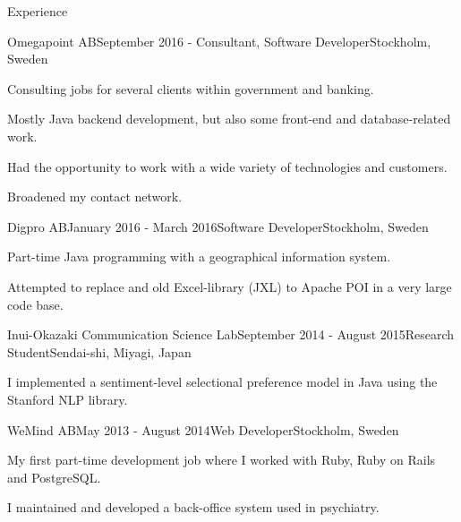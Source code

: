 \documentclass{resume} %
\begin{document}
\begin{rSection}{Experience}

\begin{rSubsection}{Omegapoint AB}{September 2016 - }{Consultant, Software Developer}{Stockholm, Sweden}
\item Consulting jobs for several clients within government and banking. 
\item Mostly Java backend development, but also some front-end and database-related work.
\item Had the opportunity to work with a wide variety of technologies and customers.
\item Broadened my contact network.
\end{rSubsection}


\begin{rSubsection}{Digpro AB}{January 2016 - March 2016}{Software Developer}{Stockholm, Sweden}
\item Part-time Java programming with a geographical information system.
\item Attempted to replace and old Excel-library (JXL) to Apache POI in a very large code base.
\end{rSubsection}


\begin{rSubsection}{Inui-Okazaki Communication Science Lab}{September 2014 - August 2015}{Research Student}{Sendai-shi, Miyagi, Japan}
\item I implemented a sentiment-level selectional preference model in Java using the Stanford NLP library.
\end{rSubsection}


\begin{rSubsection}{WeMind AB}{May 2013 - August 2014}{Web Developer}{Stockholm, Sweden}
\item My first part-time development job where I worked with Ruby, Ruby on Rails and PostgreSQL.
\item I maintained and developed a back-office system used in psychiatry.
\end{rSubsection}

\end{rSection}

\end{document}
